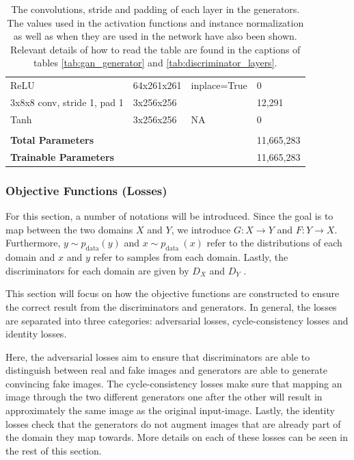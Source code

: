 \documentclass[12pt, fleqn, titlepage]{article}
\newcommand{\1}[1]{\mathds{1}\left[#1\right]}
\begin{document}
\begin{table}[H]
\begin{tabular}{llll}
		ReLU                                        & 64x261x261     & inplace=True& 0             \\
		3x8x8 conv, stride 1, pad 1                 & 3x256x256      &             & 12,291        \\
		Tanh                                        & 3x256x256      & NA          & 0             \\
		                                            &                &             &               \\
		\textbf{Total Parameters}                   &                &             & 11,665,283    \\
		\textbf{Trainable Parameters}               &                &             & 11,665,283    \\ \bottomrule
	\end{tabular}
	\caption{The convolutions, stride and padding of each layer in the generators. The values used in the activation functions and instance normalization as well as when they are used in the network have also been shown. Relevant details of how to read the table are found in the captions of tables \ref{tab:gan_generator} and \ref{tab:discriminator_layers}.}
	\label{tab:generator_layers}
\end{table}

\subsubsection{Objective Functions (Losses)}
For this section, a number of notations will be introduced. Since the goal is to map between the two domains $X$ and $Y$, we introduce $G : X \rightarrow Y$ and $F : Y \rightarrow X$. Furthermore, $y \sim p_{\text {data}}(y)$ and $x \sim p_{\text {data }}(x)$ refer to the distributions of each domain and $x$ and $y$ refer to samples from each domain. Lastly, the discriminators for each domain are given by $D_X$ and $D_Y$ \cite{original_cyclegan}.

This section will focus on how the objective functions are constructed to ensure the correct result from the discriminators and generators. In general, the losses are separated into three categories: adversarial losses, cycle-consistency losses and identity losses. 

Here, the adversarial losses aim to ensure that discriminators are able to distinguish between real and fake images and generators are able to generate convincing fake images. The cycle-consistency losses make sure that mapping an image through the two different generators one after the other will result in approximately the same image as the original input-image. Lastly, the identity losses check that the generators do not augment images that are already part of the domain they map towards. More details on each of these losses can be seen in the rest of this section.
\end{document}
